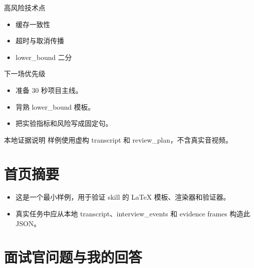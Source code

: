 \documentclass[a4paper,11pt]{article}
\begin{document}
\begin{titlepage}
\vspace{0.35cm}
\begin{minipage}[t]{0.48\textwidth}
\small
\begin{drillbox}{高风险技术点}
\begin{itemize}
\item 缓存一致性
\item 超时与取消传播
\item lower\_bound 二分
\end{itemize}
\end{drillbox}
\normalsize
\end{minipage}
\hfill
\begin{minipage}[t]{0.48\textwidth}
\small
\begin{evidencebox}{下一场优先级}
\begin{itemize}
\item 准备 30 秒项目主线。
\item 背熟 lower\_bound 模板。
\item 把实验指标和风险写成固定句。
\end{itemize}
\end{evidencebox}
\normalsize
\end{minipage}

\vfill
\begin{evidencebox}{本地证据说明}
样例使用虚构 transcript 和 review\_plan，不含真实音视频。
\end{evidencebox}
\end{titlepage}

\tableofcontents
\newpage

\section{首页摘要}

\begin{itemize}
\item 这是一个最小样例，用于验证 skill 的 LaTeX 模板、渲染器和验证器。
\item 真实任务中应从本地 transcript、interview\_events 和 evidence frames 构造此 JSON。
\end{itemize}

\section{面试官问题与我的回答}
\end{document}
